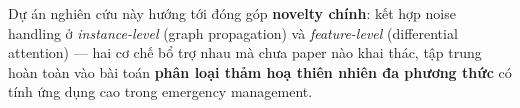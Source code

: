 \documentclass[12pt,a4paper]{article}
\begin{document}
\vspace{0.5cm}

\begin{goalbox}
Dự án nghiên cứu này hướng tới đóng góp \textbf{novelty chính}: kết hợp noise handling ở \textit{instance-level} (graph propagation) và \textit{feature-level} (differential attention) --- hai cơ chế bổ trợ nhau mà chưa paper nào khai thác, tập trung hoàn toàn vào bài toán \textbf{phân loại thảm hoạ thiên nhiên đa phương thức} có tính ứng dụng cao trong emergency management.
\end{goalbox}
\end{document}
